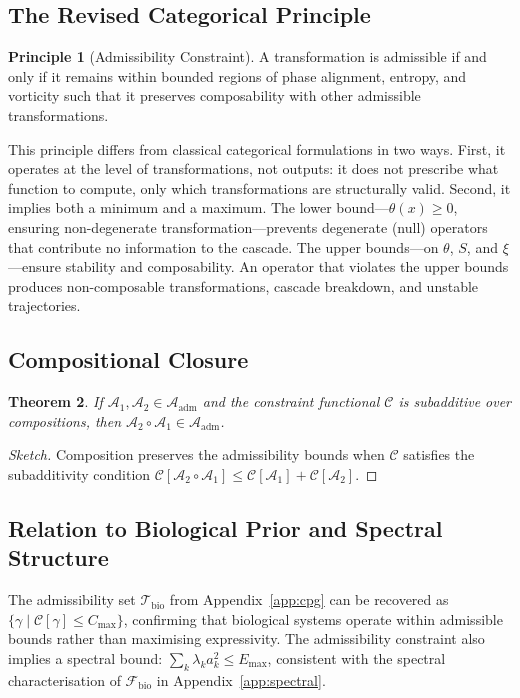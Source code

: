 \documentclass[12pt, a4paper]{article}
\newtheorem{theorem}{Theorem}[section]
\theoremstyle{remark}
\theoremstyle{definition}
\newtheorem{principle}[theorem]{Principle}
\begin{document}
\subsection{The Revised Categorical Principle}

\begin{principle}[Admissibility Constraint]
A transformation is admissible if and only if it remains within bounded regions of phase
alignment, entropy, and vorticity such that it preserves composability with other admissible
transformations.
\end{principle}

This principle differs from classical categorical formulations in two ways.  First, it
operates at the level of transformations, not outputs: it does not prescribe what function
to compute, only which transformations are structurally valid.  Second, it implies both a
minimum and a maximum.  The lower bound---$\theta(x) \ge 0$, ensuring non-degenerate
transformation---prevents degenerate (null) operators that contribute no information to
the cascade.  The upper bounds---on $\theta$, $S$, and $\xi$---ensure stability and
composability.  An operator that violates the upper bounds produces non-composable
transformations, cascade breakdown, and unstable trajectories.

\subsection{Compositional Closure}

\begin{theorem}
If $\mathcal{A}_1, \mathcal{A}_2 \in \mathcal{A}_{\mathrm{adm}}$ and the constraint
functional $\mathcal{C}$ is subadditive over compositions, then
$\mathcal{A}_2 \circ \mathcal{A}_1 \in \mathcal{A}_{\mathrm{adm}}$.
\end{theorem}

\begin{proof}[Sketch]
Composition preserves the admissibility bounds when $\mathcal{C}$ satisfies the
subadditivity condition $\mathcal{C}[\mathcal{A}_2 \circ \mathcal{A}_1] \le
\mathcal{C}[\mathcal{A}_1] + \mathcal{C}[\mathcal{A}_2]$.
\end{proof}

\subsection{Relation to Biological Prior and Spectral Structure}

The admissibility set $\mathcal{T}_{\mathrm{bio}}$ from Appendix~\ref{app:cpg} can be
recovered as $\{\gamma \mid \mathcal{C}[\gamma] \le C_{\max}\}$, confirming that biological
systems operate within admissible bounds rather than maximising expressivity.  The
admissibility constraint also implies a spectral bound: $\sum_k \lambda_k a_k^2 \le E_{\max}$,
consistent with the spectral characterisation of $\mathcal{F}_{\mathrm{bio}}$ in
Appendix~\ref{app:spectral}.
\end{document}
